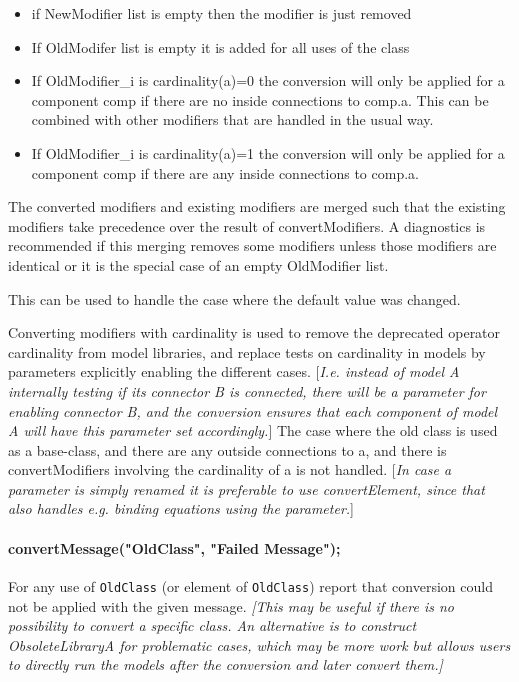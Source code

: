 \begin{itemize}
\item
  if NewModifier list is empty then the modifier is just removed
\item
  If OldModifer list is empty it is added for all uses of the class
\item
  If OldModifier\_i is cardinality(a)=0 the conversion will only be
  applied for a component comp if there are no inside connections to
  comp.a. This can be combined with other modifiers that are handled in
  the usual way.
\item
  If OldModifier\_i is cardinality(a)=1 the conversion will only be
  applied for a component comp if there are any inside connections to
  comp.a.
\end{itemize}

The converted modifiers and existing modifiers are merged such that the existing modifiers take precedence over the result of convertModifiers.
A diagnostics is recommended if this merging removes some modifiers unless those modifiers are identical or it is the special case of an empty OldModifier list.
\begin{nonnormative}
This can be used to handle the case where the default value was changed.
\end{nonnormative}

Converting modifiers with cardinality is used to remove the deprecated
operator cardinality from model libraries, and replace tests on
cardinality in models by parameters explicitly enabling the different
cases. {[}\emph{I.e. instead of model A internally testing if its
connector B is connected, there will be a parameter for enabling
connector B, and the conversion ensures that each component of model A
will have this parameter set accordingly.}{]} The case where the old
class is used as a base-class, and there are any outside connections to
a, and there is convertModifiers involving the cardinality of a is not
handled. {[}\emph{In case a parameter is simply renamed it is preferable
to use convertElement, since that also handles e.g. binding equations
using the parameter.}{]}

\paragraph*{convertMessage("OldClass", "Failed Message");}

For any use of \lstinline!OldClass! (or element of \lstinline!OldClass!) report that conversion
could not be applied with the given message. \emph{{[}This may be useful
if there is no possibility to convert a specific class. An alternative
is to construct ObsoleteLibraryA for problematic cases, which may be
more work but allows users to directly run the models after the
conversion and later convert them.{]}}

